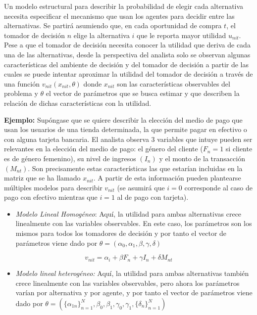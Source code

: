 \documentclass[
]{book}
\providecommand{\tightlist}{%
  \setlength{\itemsep}{0pt}\setlength{\parskip}{0pt}}
\begin{document}
Un modelo estructural para describir la probabilidad de elegir cada alternativa necesita especificar el mecanismo que usan los agentes para decidir entre las alternativas. Se partirá asumiendo que, en cada oportunidad de compra \(t\), el tomador de decisión \(n\) elige la alternativa \(i\) que le reporta mayor utilidad \(u_{nit}\). Pese a que el tomador de decisión necesita conocer la utilidad que deriva de cada una de las alternativas, desde la perspectiva del analista solo se observan algunas características del ambiente de decisión y del tomador de decisión a partir de las cuales se puede intentar aproximar la utilidad del tomador de decisión a través de una función \(v_{nit}(x_{nit}, \theta)\) donde \(x_{nit}\) son las características observables del problema y \(\theta\) el vector de parámetros que se busca estimar y que describen la relación de dichas características con la utilidad.

\textbf{Ejemplo:} Supóngase que se quiere describir la elección del medio de pago que usan los usuarios de una tienda determinada, la que permite pagar en efectivo o con alguna tarjeta bancaria. El analista observa 3 variables que intuye pueden ser relevantes en la elección del medio de pago: el género del cliente (\(F_n = 1\) si cliente es de género femenino), su nivel de ingresos \((I_n)\) y el monto de la transacción \((M_{nt})\). Son precisamente estas características las que estarían incluidas en la matriz que se ha llamado \(x_{nit}\). A partir de esta información pueden plantearse múltiples modelos para describir \(v_{nit}\) (se asumirá que \(i = 0\) corresponde al caso de pago con efectivo mientras que \(i = 1\) al de pago con tarjeta).

\begin{itemize}
\tightlist
\item
  \emph{Modelo Lineal Homogéneo}: Aquí, la utilidad para ambas alternativas crece linealmente con las variables observables. En este caso, los parámetros son los mismos para todos los tomadores de decisión y por tanto el vector de parámetros viene dado por \(\theta = (\alpha_0, \alpha_1, \beta, \gamma, \delta)\)
\end{itemize}

\[v_{nit} = \alpha_i + \beta F_n + \gamma I_n + \delta M_{nt}\]

\begin{itemize}
\tightlist
\item
  \emph{Modelo lineal heterogéneo:} Aquí, la utilidad para ambas alternativas también crece linealmente con las variables observables, pero ahora los parámetros varían por alternativa y por agente, y por tanto el vector de parámetros viene dado por \(\theta = ( \{ \alpha_{1n} \} _{n=1}^{N}, \beta_0,\beta_1,\gamma_0,\gamma_1,\{ \delta_n \}_{n=1}^{N} )\)
\end{itemize}
\end{document}
